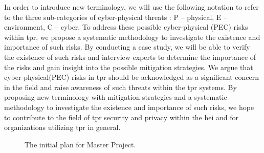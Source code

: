 In order to introduce new terminology, we will use the following notation to refer to the three sub-categories of cyber-physical threats
: P -- physical, E -- environment, C -- cyber. To address these possible cyber-physical (PEC) risks within \ac{tpr}, we
propose a systematic methodology to investigate the existence and importance of such risks. By conducting a case study, we will be able to
verify the existence of such risks and interview experts to determine the importance of the risks and gain insight into the possible
mitigation strategies. We argue that cyber-physical(PEC) risks in \ac{tpr} should be acknowledged as a significant concern in
the field and raise awareness of such threats within the \ac{tpr} systems. By proposing new terminology with
mitigation strategies and a systematic methodology to investigate the existence and importance of such risks, we hope to contribute to the
field of \ac{tpr} security and privacy within the \ac{hei} and for organizations utilizing \ac{tpr} in general.

\begin{figure}
\centering
{}
\caption{The initial plan for Master Project.}
\label{fig:flowdiagram}
\end{figure}
